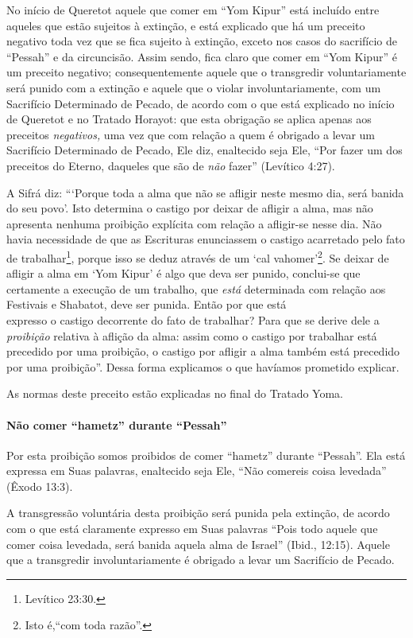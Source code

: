 No início de Queretot aquele que comer em ``Yom Kipur'' está incluído
entre aqueles que estão sujeitos à extinção, e está explicado que há
um preceito negativo toda vez que se fica sujeito à extinção, exceto nos
casos do sacrifício de ``Pessah'' e da circuncisão. Assim sendo, fica
claro que comer em ``Yom Kipur'' é um preceito negativo; consequentemente aquele que o
transgredir voluntariamente será punido com a extinção e aquele que o violar
involuntariamente, com um Sacrifício Determinado de Pecado, de acordo
com o que está explicado no início de Queretot e no Tratado Horayot: que
esta obrigação se aplica apenas aos preceitos \emph{negativos,} uma vez
que com relação a quem é obrigado a levar um Sacrifício Determinado de
Pecado, Ele diz, enaltecido seja Ele, ``Por fazer um dos preceitos do
Eterno, daqueles que são de \emph{não} fazer'' (Levítico 4:27).

A Sifrá diz: ```Porque toda a alma que não se afligir neste mesmo dia,
será banida do seu povo'. Isto determina o castigo por deixar de afligir
a alma, mas não apresenta nenhuma proibição explícita com relação a afligir-se
nesse dia. Não havia necessidade de que as Escrituras enunciassem o castigo
acarretado pelo fato de trabalhar\footnote{Levítico 23:30.}, porque isso se
deduz através de um `cal vahomer'\footnote{Isto é,``com toda razão''.}. Se deixar de
afligir a alma em `Yom Kipur' é algo que deva ser punido, conclui-se que
certamente a execução de um trabalho, que \emph{está} determinada com
relação aos Festivais e Shabatot, deve ser punida. Então por que está\\
expresso o castigo decorrente do fato de trabalhar? Para que se derive
dele a \emph{proibição} relativa à aflição da alma: assim como o castigo por
trabalhar está precedido por uma proibição, o castigo por afligir a alma
também está precedido por uma proibição''. Dessa forma explicamos o que havíamos prometido explicar.

As normas deste preceito estão explicadas no final do Tratado Yoma.

\paragraph{Não comer ``hametz'' durante ``Pessah''}

Por esta proibição somos proibidos de comer ``hametz'' durante
``Pessah''. Ela está expressa em Suas palavras, enaltecido seja Ele,
``Não comereis coisa levedada'' (Êxodo 13:3).

A transgressão voluntária desta proibição será punida pela extinção, de
acordo com o que está claramente expresso em Suas palavras ``Pois todo
aquele que comer coisa levedada, será banida aquela alma de Israel''
(Ibid., 12:15). Aquele que a transgredir involuntariamente é obrigado a
levar um Sacrifício de Pecado.

